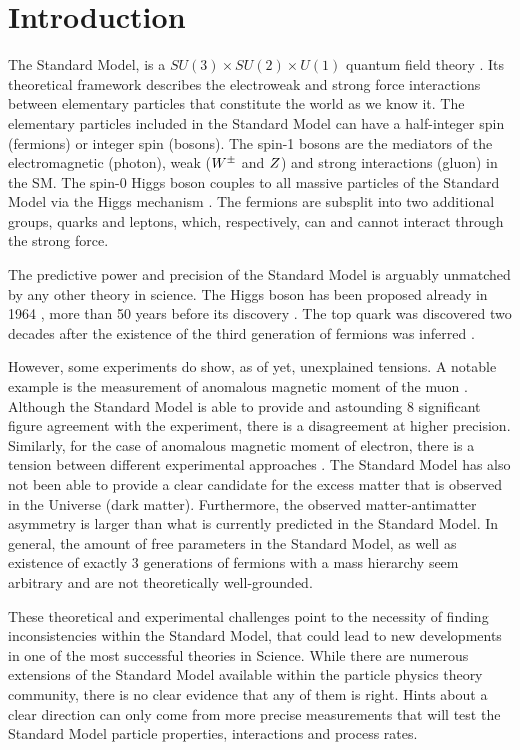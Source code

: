 \chapter{Introduction}

The Standard Model, is a $SU(3)\times SU(2)\times U(1)$ quantum field theory \cite{Peskin:1995ev}.
Its theoretical framework describes the electroweak and strong force interactions between elementary particles that constitute the world as we know it.
The elementary particles included in the Standard Model can have a half-integer spin (fermions) or integer spin (bosons).
The spin-1 bosons are the mediators of the electromagnetic (photon), weak ($W^\pm$ and $Z$) and strong interactions (gluon) in the SM.
The spin-0 Higgs boson couples to all massive particles of the Standard Model via the Higgs mechanism \cite{PhysRevLett.13.508}.
The fermions are subsplit into two additional groups, quarks and leptons, which, respectively, can and cannot interact through the strong force.

The predictive power and precision of the Standard Model is arguably unmatched by any other theory in science.
The Higgs boson has been proposed already in 1964 \cite{PhysRevLett.13.508}, more than 50 years before its discovery \cite{ATLAS:2012yve,CMS:2012qbp}.
The top quark was discovered \cite{PhysRevLett.74.2632,PhysRevLett.74.2626} two decades after the existence of the third generation of fermions was inferred \cite{HARARI1975265}.

However, some experiments do show, as of yet, unexplained tensions. 
A notable example is the measurement of anomalous magnetic moment of the muon \cite{PhysRevLett.126.141801}.
Although the Standard Model is able to provide and astounding 8 significant figure agreement with the experiment, there is a disagreement at higher precision.
Similarly, for the case of anomalous magnetic moment of electron, there is a tension between different experimental approaches \cite{PhysRevLett.100.120801,Morel:2020dww,Li:2021koa}.
The Standard Model has also not been able to provide a clear candidate for the excess matter that is observed in the Universe (dark matter).
Furthermore, the observed matter-antimatter asymmetry is larger than what is currently predicted in the Standard Model.
In general, the amount of free parameters in the Standard Model, as well as existence of exactly 3 generations of fermions with a mass hierarchy seem arbitrary and are not theoretically well-grounded.

These theoretical and experimental challenges point to the necessity of finding inconsistencies within the Standard Model, that could lead to new developments in one of the most successful theories in Science.
While there are numerous extensions of the Standard Model available within the particle physics theory community, there is no clear evidence that any of them is right.
Hints about a clear direction can only come from more precise measurements that will test the Standard Model particle properties, interactions and process rates.


